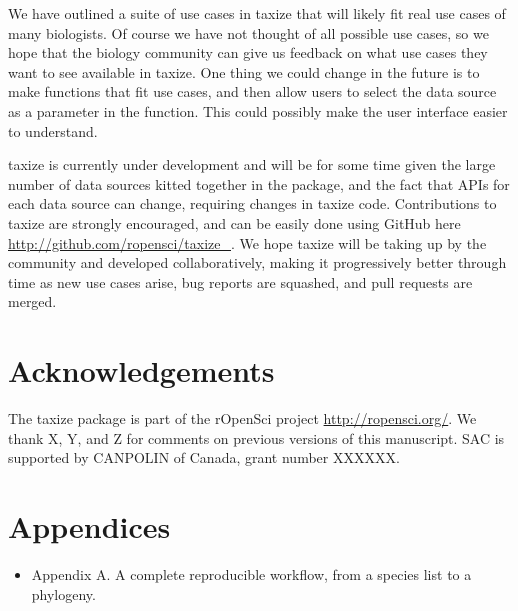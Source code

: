 \documentclass[letterpaper,superscriptaddress,showkeys,longbibliography,10pt]{revtex4-1}\usepackage{graphicx, color}
\begin{document}
We have outlined a suite of use cases in taxize that will likely fit real use cases of many biologists. Of course we have not thought of all possible use cases, so we hope that the biology community can give us feedback on what use cases they want to see available in taxize. One thing we could change in the future is to make  functions that fit use cases, and then allow users to select the data source as a parameter in the function. This could possibly make the user interface easier to understand.

taxize is currently under development and will be for some time given the large number of data sources kitted together in the package, and the fact that APIs for each data source can change, requiring changes in taxize code. Contributions to taxize are strongly encouraged, and can be easily done using GitHub here \url{http://github.com/ropensci/taxize_}. We hope taxize will be taking up by the community and developed collaboratively, making it progressively better through time as new use cases arise, bug reports are squashed, and pull requests are merged.


\section{Acknowledgements}

The taxize package is part of the rOpenSci project \url{http://ropensci.org/}. We thank X, Y, and Z for comments on previous versions of this manuscript. SAC is supported by CANPOLIN of Canada, grant number XXXXXX. 

\section{Appendices}

\begin{itemize}
    \item{Appendix A.} A complete reproducible workflow, from a species list to a phylogeny. 
\end{itemize}


\end{document}

